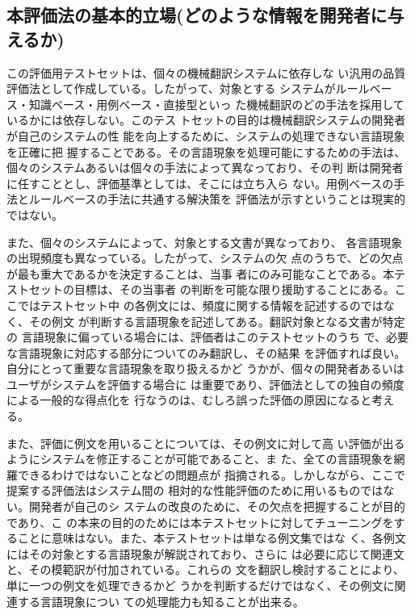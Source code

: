 \subsection{本評価法の基本的立場(どのような情報を開発者に与えるか)}

この評価用テストセットは、個々の機械翻訳システムに依存しな
い汎用の品質評価法として作成している。したがって、対象とする
システムがルールベース・知識ベース・用例ベース・直接型といっ
た機械翻訳のどの手法を採用しているかには依存しない。このテス
トセットの目的は機械翻訳システムの開発者が自己のシステムの性
能を向上するために、システムの処理できない言語現象を正確に把
握することである。その言語現象を処理可能にするための手法は、
個々のシステムあるいは個々の手法によって異なっており、その判
断は開発者に任すこととし、評価基準としては、そこには立ち入ら
ない。用例ベースの手法とルールベースの手法に共通する解決策を
評価法が示すということは現実的ではない。

また、個々のシステムによって、対象とする文書が異なっており、
各言語現象の出現頻度も異なっている。したがって、システムの欠
点のうちで、どの欠点が最も重大であるかを決定することは、当事
者にのみ可能なことである。本テストセットの目標は、その当事者
の判断を可能な限り援助することにある。ここではテストセット中
の各例文には、頻度に関する情報を記述するのではなく、その例文
が判断する言語現象を記述してある。翻訳対象となる文書が特定の
言語現象に偏っている場合には、評価者はこのテストセットのうち
で、必要な言語現象に対応する部分についてのみ翻訳し、その結果
を評価すれば良い。自分にとって重要な言語現象を取り扱えるかど
うかが、個々の開発者あるいはユーザがシステムを評価する場合に
は重要であり、評価法としての独自の頻度による一般的な得点化を
行なうのは、むしろ誤った評価の原因になると考える。

また、評価に例文を用いることについては、その例文に対して高
い評価が出るようにシステムを修正することが可能であること、ま
た、全ての言語現象を網羅できるわけではないことなどの問題点が
指摘される。しかしながら、ここで提案する評価法はシステム間の
相対的な性能評価のために用いるものではない。開発者が自己のシ
ステムの改良のために、その欠点を把握することが目的であり、こ
の本来の目的のためには本テストセットに対してチューニングをす
ることに意味はない。また、本テストセットは単なる例文集ではな
く、各例文にはその対象とする言語現象が解説されており、さらに
は必要に応じて関連文と、その模範訳が付加されている。これらの
文を翻訳し検討することにより、単に一つの例文を処理できるかど
うかを判断するだけではなく、その例文に関連する言語現象につい
ての処理能力も知ることが出来る。

